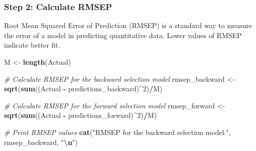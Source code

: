 \documentclass[
]{article}
\newenvironment{Shaded}{\begin{snugshade}}{\end{snugshade}}
\newcommand{\AttributeTok}[1]{\textcolor[rgb]{0.13,0.29,0.53}{#1}}
\newcommand{\CommentTok}[1]{\textcolor[rgb]{0.56,0.35,0.01}{\textit{#1}}}
\newcommand{\DecValTok}[1]{\textcolor[rgb]{0.00,0.00,0.81}{#1}}
\newcommand{\FunctionTok}[1]{\textcolor[rgb]{0.13,0.29,0.53}{\textbf{#1}}}
\newcommand{\NormalTok}[1]{#1}
\newcommand{\OtherTok}[1]{\textcolor[rgb]{0.56,0.35,0.01}{#1}}
\newcommand{\SpecialCharTok}[1]{\textcolor[rgb]{0.81,0.36,0.00}{\textbf{#1}}}
\newcommand{\StringTok}[1]{\textcolor[rgb]{0.31,0.60,0.02}{#1}}
\begin{document}
\begin{Shaded}
\end{Shaded}

\hypertarget{step-2-calculate-rmsep}{%
\subsubsection{Step 2: Calculate RMSEP}\label{step-2-calculate-rmsep}}

Root Mean Squared Error of Prediction (RMSEP) is a standard way to
measure the error of a model in predicting quantitative data. Lower
values of RMSEP indicate better fit.

\begin{Shaded}
\begin{Highlighting}[]
\NormalTok{M }\OtherTok{\textless{}{-}} \FunctionTok{length}\NormalTok{(Actual)}

\CommentTok{\# Calculate RMSEP for the backward selection model}
\NormalTok{rmsep\_backward }\OtherTok{\textless{}{-}} \FunctionTok{sqrt}\NormalTok{(}\FunctionTok{sum}\NormalTok{((Actual }\SpecialCharTok{{-}}\NormalTok{ predictions\_backward)}\SpecialCharTok{\^{}}\DecValTok{2}\NormalTok{)}\SpecialCharTok{/}\NormalTok{M)}

\CommentTok{\# Calculate RMSEP for the forward selection model}
\NormalTok{rmsep\_forward }\OtherTok{\textless{}{-}} \FunctionTok{sqrt}\NormalTok{(}\FunctionTok{sum}\NormalTok{((Actual }\SpecialCharTok{{-}}\NormalTok{ predictions\_forward)}\SpecialCharTok{\^{}}\DecValTok{2}\NormalTok{)}\SpecialCharTok{/}\NormalTok{M)}

\CommentTok{\# Print RMSEP values}
\FunctionTok{cat}\NormalTok{(}\StringTok{"RMSEP for the backward selection model:"}\NormalTok{, rmsep\_backward, }\StringTok{"}\SpecialCharTok{\textbackslash{}n}\StringTok{"}\NormalTok{)}
\end{Highlighting}
\end{Shaded}
\end{document}
